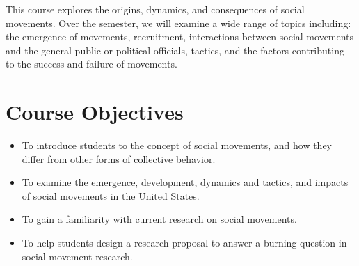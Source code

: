\documentclass[12pt]{article}
\begin{document}
This course explores the origins, dynamics, and consequences of social movements. Over the semester, we will examine a wide range of topics including: the emergence of movements, recruitment, interactions between social movements and the general public or political officials, tactics, and the factors contributing to the success and failure of movements.

\section*{Course Objectives}
\begin{itemize}
\item To introduce students to the concept of social movements, and how they differ from other forms of collective behavior.
\item To examine the emergence, development, dynamics and tactics, and impacts of social movements in the United States.
\item To gain a familiarity with current research on social movements.
\item To help students design a research proposal to answer a burning question in social movement research.
\end{itemize}





\end{document}
